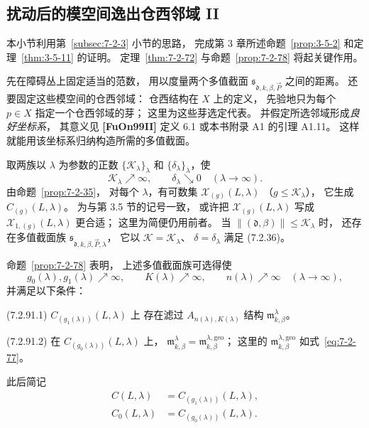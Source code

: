
\subsection{扰动后的模空间逸出仓西邻域 II}
\label{subsec:7-2-8}

本小节利用第~\ref{subsec:7-2-3} 小节的思路，
完成第 3 章所述命题~\ref{prop:3-5-2}
和定理~\ref{thm:3-5-11} 的证明。
定理~\ref{thm:7-2-72}
与命题~\ref{prop:7-2-78}
将起关键作用。

先在障碍丛上固定适当的范数，
用以度量两个多值截面
$\mathfrak s_{\mathfrak d,k,\beta,\vec P}$
之间的距离。
还要固定这些模空间的仓西邻域：
仓西结构在 $X$ 上的定义，
先验地只为每个 $p\in X$ 指定一个仓西邻域的芽；
这里为这些芽选定代表。
并假定所选邻域形成\emph{良好坐标系}，
其意义见 \textbf{[FuOn99II]} 定义 6.1
或本书附录 A1 的引理 A1.11。
这样就能用该坐标系归纳构造所需的多值截面。

取两族以 $\lambda$ 为参数的正数
$\{\mathcal K_\lambda\}_\lambda$
和 $\{\delta_\lambda\}_\lambda$，使
\[
\mathcal K_\lambda\nearrow\infty,
\qquad
\delta_\lambda\searrow0
\quad(\lambda\to\infty).
\]
由命题~\ref{prop:7-2-35}，
对每个 $\lambda$，有可数集
$\mathcal X_{(g)}(L,\lambda)$
（$g\le\mathcal K_\lambda$），
它生成 $C_{(g)}(L,\lambda)$。
为与第 3.5 节的记号一致，
或许把 $\mathcal X_{(g)}(L,\lambda)$
写成 $\mathcal X_{1,(g)}(L,\lambda)$ 更合适；
这里为简便仍用前者。
当 $\|(\mathfrak d,\beta)\|\le\mathcal K_\lambda$ 时，
还存在多值截面族
$\mathfrak s_{\mathfrak d,k,\beta,\vec P,\lambda}$，
它以 $\mathcal K=\mathcal K_\lambda$、
$\delta=\delta_\lambda$ 满足 (7.2.36)。

命题~\ref{prop:7-2-78} 表明，
上述多值截面族可选得使
\[
g_0(\lambda),g_1(\lambda)\nearrow\infty,
\qquad K(\lambda)\nearrow\infty,
\qquad n(\lambda)\nearrow\infty
\quad(\lambda\to\infty),
\]
并满足以下条件：

\noindent\textup{(7.2.91.1)}\quad
$C_{(g_1(\lambda))}(L,\lambda)$ 上
存在滤过 $A_{n(\lambda),K(\lambda)}$ 结构
$\mathfrak m^\lambda_{k,\beta}$。

\noindent\textup{(7.2.91.2)}\quad
在 $C_{(g_0(\lambda))}(L,\lambda)$ 上，
$\mathfrak m^\lambda_{k,\beta}
=\mathfrak m^{\lambda,\mathrm{geo}}_{k,\beta}$；
这里的 $\mathfrak m^{\lambda,\mathrm{geo}}_{k,\beta}$
如式~\eqref{eq:7-2-77}。

此后简记
\begin{align}
C(L,\lambda)
&=C_{(g_1(\lambda))}(L,\lambda),
\tag{7.2.92.1}\label{eq:7-2-92-1}\\
C_0(L,\lambda)
&=C_{(g_0(\lambda))}(L,\lambda).
\tag{7.2.92.2}\label{eq:7-2-92-2}
\end{align}


